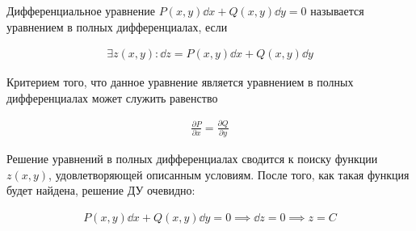 
\begin{definition}
  Дифференциальное уравнение \(P(x, y) \dd x + Q(x, y) \dd y = 0\) называется
  уравнением в полных дифференциалах, если
  
  \begin{align*}
    \exists z(x, y) \colon \dd z = P(x, y) \dd x + Q(x, y) \dd y
  \end{align*}
\end{definition}

Критерием того, что данное уравнение является уравнением в полных
дифференциалах может служить равенство

\begin{align*}
  \frac{\partial P}{\partial x} = \frac{\partial Q}{\partial y} 
\end{align*}

Решение уравнений в полных дифференциалах сводится к поиску функции \(z(x, y)\),
удовлетворяющей описанным условиям. После того, как такая функция будет найдена,
решение ДУ очевидно:

\begin{align*}
  P(x, y) \dd x + Q(x, y) \dd y = 0
  \implies \dd z = 0
  \implies z = C
\end{align*}

